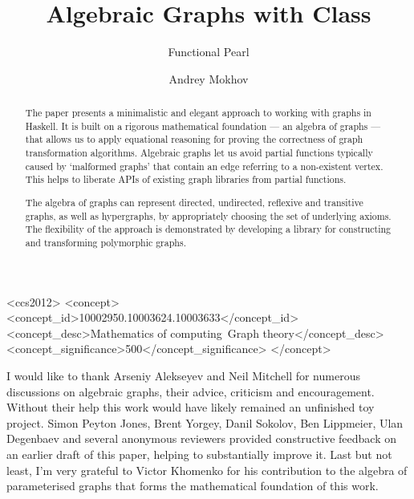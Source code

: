\documentclass[sigplan]{acmart}
\begin{document}
\title{Algebraic Graphs with Class\vspace{-1.5mm}}
\subtitle{Functional Pearl}

\author{Andrey Mokhov}

\begin{abstract}
\vspace{-1mm}
The paper presents a minimalistic and elegant approach to working
with graphs in Haskell. It is built on a rigorous
mathematical foundation --- an algebra of graphs --- that allows us to apply
equational reasoning for proving the correctness of graph transformation
algorithms. Algebraic graphs let us avoid partial functions typically
caused by `malformed graphs' that contain an edge referring to
a non-existent vertex. This helps to liberate APIs of existing graph libraries
from partial functions.

The algebra of graphs can represent directed, undirected, reflexive
and transitive graphs, as well as hypergraphs, by appropriately choosing
the set of underlying axioms. The flexibility of the approach is
demonstrated by developing a library for constructing
and transforming polymorphic graphs.
\end{abstract}

\begin{CCSXML}
<ccs2012>
<concept>
<concept_id>10002950.10003624.10003633</concept_id>
<concept_desc>Mathematics of computing~Graph theory</concept_desc>
<concept_significance>500</concept_significance>
</concept>
\end{CCSXML}


\maketitle









\begin{acks}
  I would like to thank Arseniy Alekseyev and Neil Mitchell
  for numerous discussions on algebraic graphs, their advice,
  criticism and encouragement. Without their help this work would
  have likely remained an unfinished toy project.
  Simon Peyton Jones, Brent Yorgey, Danil Sokolov, Ben Lippmeier, Ulan Degenbaev
  and several anonymous reviewers provided constructive feedback on an
  earlier draft of this paper, helping to substantially improve it. Last but
  not least, I'm very grateful to Victor Khomenko for his contribution to the
  algebra of parameterised graphs that forms the mathematical foundation of this work.
\end{acks}


\end{document}
